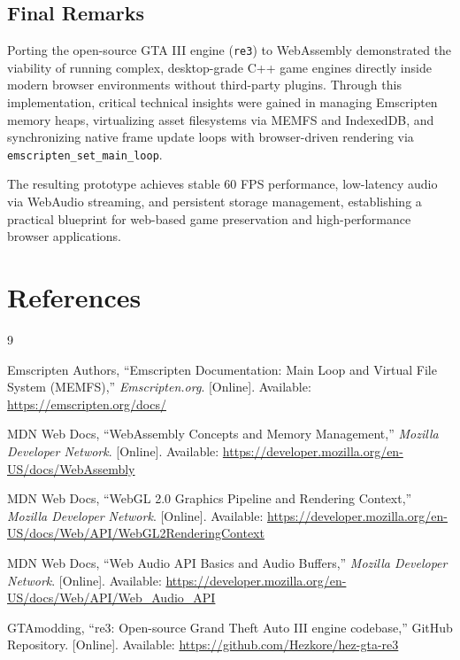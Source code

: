\documentclass[12pt,a4paper]{article}
\begin{document}
\subsection{Final Remarks}
Porting the open-source GTA III engine (\texttt{re3}) to WebAssembly demonstrated the viability of running complex, desktop-grade C++ game engines directly inside modern browser environments without third-party plugins. Through this implementation, critical technical insights were gained in managing Emscripten memory heaps, virtualizing asset filesystems via MEMFS and IndexedDB, and synchronizing native frame update loops with browser-driven rendering via \texttt{emscripten\_set\_main\_loop}. 

The resulting prototype achieves stable 60 FPS performance, low-latency audio via WebAudio streaming, and persistent storage management, establishing a practical blueprint for web-based game preservation and high-performance browser applications.

\section{References}
\begingroup
\renewcommand{\section}[2]{}
\begin{thebibliography}{9}

Emscripten Authors, ``Emscripten Documentation: Main Loop and Virtual File System (MEMFS),'' \emph{Emscripten.org}. [Online]. Available: \url{https://emscripten.org/docs/}

MDN Web Docs, ``WebAssembly Concepts and Memory Management,'' \emph{Mozilla Developer Network}. [Online]. Available: \url{https://developer.mozilla.org/en-US/docs/WebAssembly}

MDN Web Docs, ``WebGL 2.0 Graphics Pipeline and Rendering Context,'' \emph{Mozilla Developer Network}. [Online]. Available: \url{https://developer.mozilla.org/en-US/docs/Web/API/WebGL2RenderingContext}

MDN Web Docs, ``Web Audio API Basics and Audio Buffers,'' \emph{Mozilla Developer Network}. [Online]. Available: \url{https://developer.mozilla.org/en-US/docs/Web/API/Web_Audio_API}

GTAmodding, ``re3: Open-source Grand Theft Auto III engine codebase,'' GitHub Repository. [Online]. Available: \url{https://github.com/Hezkore/hez-gta-re3}

\end{thebibliography}
\end{document}
